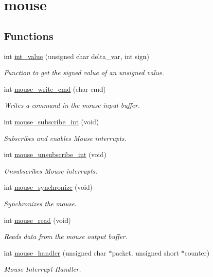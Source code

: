 \hypertarget{group__mouse}{}\section{mouse}
\label{group__mouse}
\subsection*{Functions}
\begin{DoxyCompactItemize}
\item 
int \hyperlink{group__mouse_gaf67a039319066d9e7dcdcc90e3a48840}{int\+\_\+value} (unsigned char delta\+\_\+var, int sign)
\begin{DoxyCompactList}\small\item\em Function to get the signed value of an unsigned value. \end{DoxyCompactList}\item 
int \hyperlink{group__mouse_gad26aa3828c4a6d900e654de8e4e68e83}{mouse\+\_\+write\+\_\+cmd} (char cmd)
\begin{DoxyCompactList}\small\item\em Writes a command in the mouse input buffer. \end{DoxyCompactList}\item 
int \hyperlink{group__mouse_ga51e6ee02a5c0a7e618abde7250cd0841}{mouse\+\_\+subscribe\+\_\+int} (void)
\begin{DoxyCompactList}\small\item\em Subscribes and enables Mouse interrupts. \end{DoxyCompactList}\item 
int \hyperlink{group__mouse_ga7614d1f22092d37078f6a3da58f7c957}{mouse\+\_\+unsubscribe\+\_\+int} (void)
\begin{DoxyCompactList}\small\item\em Unsubscribes Mouse interrupts. \end{DoxyCompactList}\item 
int \hyperlink{group__mouse_gacf07c98dc574238b3da9388c3dd1042a}{mouse\+\_\+synchronize} (void)
\begin{DoxyCompactList}\small\item\em Synchronizes the mouse. \end{DoxyCompactList}\item 
int \hyperlink{group__mouse_gaaff93ce65c5bddd94904122f0e336233}{mouse\+\_\+read} (void)
\begin{DoxyCompactList}\small\item\em Reads data from the mouse output buffer. \end{DoxyCompactList}\item 
int \hyperlink{group__mouse_gab5168a5f260c8e28f0f75db8a35cdb98}{mouse\+\_\+handler} (unsigned char $\ast$packet, unsigned short $\ast$counter)
\begin{DoxyCompactList}\small\item\em Mouse Interrupt Handler. \end{DoxyCompactList}\end{DoxyCompactItemize}


